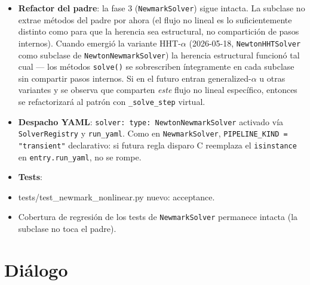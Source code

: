 \documentclass[11pt,letterpaper,oneside]{report}
\begin{document}
\begin{itemize}
  \item \textbf{Refactor del padre}: la fase 3 (\texttt{NewmarkSolver}) sigue intacta. La subclase no extrae métodos del padre por ahora (el flujo no lineal es lo suficientemente distinto como para que la herencia sea estructural, no compartición de pasos internos). Cuando emergió la variante HHT-\ensuremath{\alpha} (2026-05-18, \texttt{NewtonHHTSolver} como subclase de \texttt{NewtonNewmarkSolver}) la herencia estructural funcionó tal cual --- los métodos \texttt{solve()} se sobrescriben íntegramente en cada subclase sin compartir pasos internos. Si en el futuro entran generalized-\ensuremath{\alpha} u otras variantes y se observa que comparten \textit{este} flujo no lineal específico, entonces se refactorizará al patrón con \texttt{\_solve\_step} virtual.
  \item \textbf{Despacho YAML}: \texttt{solver: type: NewtonNewmarkSolver} activado vía \texttt{SolverRegistry} y \texttt{run\_yaml}. Como en \texttt{NewmarkSolver}, \texttt{PIPELINE\_KIND = "transient"} declarativo: si futura regla disparo C reemplaza el \texttt{isinstance} en \texttt{entry.run\_yaml}, no se rompe.
  \item \textbf{Tests}:
  \item tests/test\_newmark\_nonlinear.py nuevo: acceptance.
  \item Cobertura de regresión de los tests de \texttt{NewmarkSolver} permanece intacta (la subclase no toca el padre).
\end{itemize}


\section{Diálogo}
\end{document}
